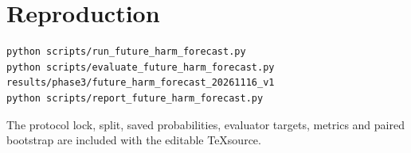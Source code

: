 \documentclass[10pt,a4paper]{article}
\begin{document}
\section{Reproduction}
\begin{verbatim}
python scripts/run_future_harm_forecast.py
python scripts/evaluate_future_harm_forecast.py results/phase3/future_harm_forecast_20261116_v1
python scripts/report_future_harm_forecast.py
\end{verbatim}
The protocol lock, split, saved probabilities, evaluator targets, metrics and paired bootstrap are included with the editable \TeX source.
\end{document}

